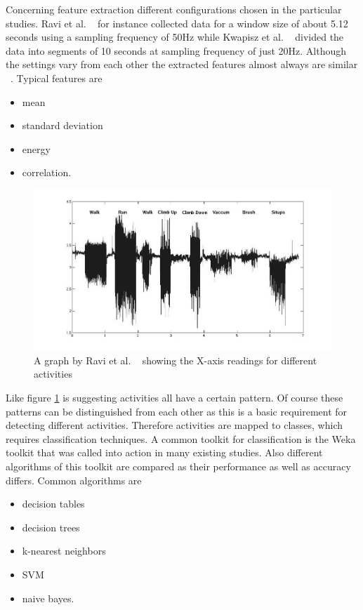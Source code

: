 \documentclass[conference]{IEEEtran}
\begin{document}
Concerning feature extraction different configurations chosen in the particular studies. Ravi et al. ~\cite{Ravi2005} for instance collected data for a window size of about 5.12 seconds using a sampling frequency of 50Hz while Kwapisz et al. ~\cite{Kwapisz2011} divided the data into segments of 10 seconds at sampling frequency of just 20Hz. Although the settings vary from each other the extracted features almost always are similar ~\cite{Ravi2005}. Typical features are
\begin{itemize}
\item mean
\item standard deviation
\item energy
\item correlation.
\end{itemize}

\begin{figure}[!htb]
\centering
\includegraphics[width=\linewidth]{different_activities}
\caption{A graph by Ravi et al. ~\cite{Ravi2005} showing the X-axis readings for different activities}
\label{fig:differentActivities}
\end{figure}
Like figure \ref{fig:differentActivities} is suggesting activities all have a certain pattern. Of course these patterns can be distinguished from each other as this is a basic requirement for detecting different activities. Therefore activities are mapped to classes, which requires classification techniques. A common toolkit for classification is the Weka toolkit that was called into action in many existing studies. Also different algorithms of this toolkit are compared as their performance as well as accuracy differs. Common algorithms are ~\cite{Ravi2005}
\begin{itemize}
\item decision tables
\item decision trees
\item k-nearest neighbors
\item \ac{SVM}
\item naive bayes.
\end{itemize}
\end{document}
